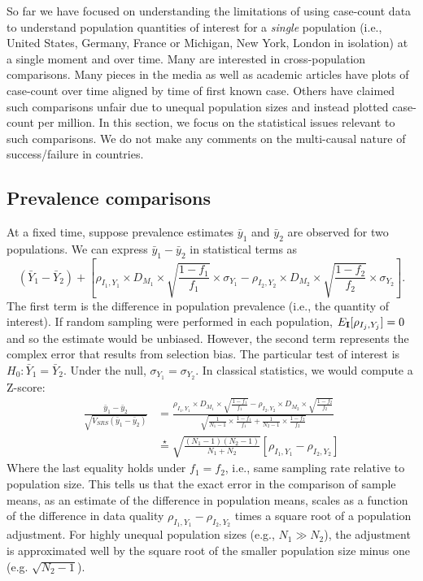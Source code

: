 \documentclass[12pt]{article}
\def\I{{\bf I}}
\begin{document}
So far we have focused on understanding the limitations of using case-count data to understand population quantities of interest for a \emph{single} population (i.e., United States, Germany, France or Michigan, New York, London in isolation) at a single moment and over time.  Many are interested in cross-population comparisons.  Many pieces in the media as well as academic articles have plots of case-count over time aligned by time of first known case.  Others have claimed such comparisons unfair due to unequal population sizes and instead plotted case-count per million.  In this section, we focus on the statistical issues relevant to such comparisons. We do not make any comments on the multi-causal nature of success/failure in countries.

\subsection*{Prevalence comparisons}

At a fixed time, suppose prevalence estimates $\bar y_1$ and $\bar y_2$ are observed for two populations. We can express $\bar y_1 - \bar y_2$ in statistical terms as
$$
(\bar Y_1 - \bar Y_2) + \left[ \rho_{I_1, Y_1} \times D_{M_1} \times \sqrt{\frac{1-f_1}{f_1}} \times \sigma_{Y_1}  - \rho_{I_2, Y_2} \times D_{M_2} \times \sqrt{\frac{1-f_2}{f_2}} \times \sigma_{Y_2} \right].
$$
The first term is the difference in population prevalence (i.e., the quantity of interest).  If random sampling were performed in each population, $E_{\I} [ \rho_{I_j, Y_j}] = 0$ and so the estimate would be unbiased.  However, the second term represents the complex error that results from selection bias.
The particular test of interest is $H_0: \bar Y_1 = \bar Y_2$.  Under the null, $\sigma_{Y_1} = \sigma_{Y_2}$.  In classical statistics, we would compute a Z-score:
$$
\begin{aligned}
\frac{\bar y_1 - \bar y_2}{ \sqrt{V_{SRS} (\bar y_1 - \bar y_2)} } &=
\frac{\rho_{I_1, Y_1} \times D_{M_1} \times \sqrt{\frac{1-f_1}{f_1}}  - \rho_{I_2, Y_2} \times D_{M_2} \times \sqrt{\frac{1-f_2}{f_2}} }{ \sqrt{\frac{1}{N_1 -1} \times \frac{1-f_1}{f_1} + \frac{1}{N_2 - 1} \times \frac{1-f_2}{f_2}} }  \\
&\overset{\star}{=}
\sqrt{\frac{(N_1-1)(N_2 -1)}{N_1 + N_2}} \left[ \rho_{I_1, Y_1} - \rho_{I_2, Y_2} \right]
\end{aligned}
$$
Where the last equality holds under $f_1 = f_2$, i.e., same sampling rate relative to population size. This tells us that the exact error in the comparison of sample means, as an estimate of the difference in population means, scales as a function of the difference in data quality $\rho_{I_1, Y_1} - \rho_{I_2, Y_2}$ times a square root of a population adjustment.  For highly unequal population sizes (e.g., $N_1 \gg N_2$), the adjustment is approximated well by the square root of the smaller population size minus one (e.g. $\sqrt{N_2 -1}$).
\end{document}
